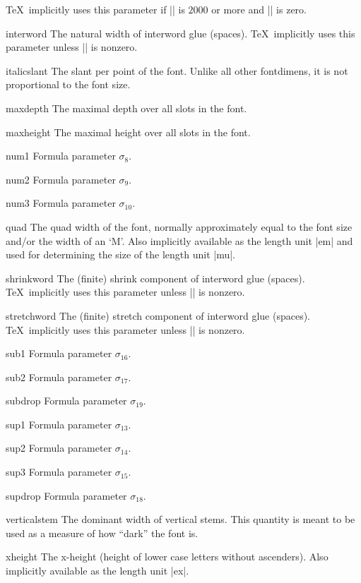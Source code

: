 \documentclass[a4paper]{article}
\begin{document}
\begin{list}{}
  \TeX\ implicitly uses this parameter if |\spacefactor| is $2000$ or 
  more and |\xspaceskip| is zero.
\item[interword]
  The natural width of interword glue (spaces). \TeX\ implicitly uses 
  this parameter unless |\spaceskip| is nonzero.
\item[italicslant]
  The slant per point of the font. Unlike all other fontdimens, it is 
  not proportional to the font size. 
\item[maxdepth]
  The maximal depth over all slots in the font.
\item[maxheight]
  The maximal height over all slots in the font.
\item[num1] Formula parameter $\sigma_{8}$.
\item[num2] Formula parameter $\sigma_{9}$.
\item[num3] Formula parameter $\sigma_{10}$.
\item[quad]
  The quad width of the font, normally approximately equal to the 
  font size and\slash or the width of an `M'. Also implicitly available 
  as the length unit |em| and used for determining the size of the 
  length unit |mu|.
\item[shrinkword]
  The (finite) shrink component of interword glue (spaces). \TeX\ 
  implicitly uses this parameter unless |\spaceskip| is nonzero.
\item[stretchword]
  The (finite) stretch component of interword glue (spaces). \TeX\ 
  implicitly uses this parameter unless |\spaceskip| is nonzero.
\item[sub1] Formula parameter $\sigma_{16}$.
\item[sub2] Formula parameter $\sigma_{17}$.
\item[subdrop] Formula parameter $\sigma_{19}$.
\item[sup1] Formula parameter $\sigma_{13}$.
\item[sup2] Formula parameter $\sigma_{14}$.
\item[sup3] Formula parameter $\sigma_{15}$.
\item[supdrop] Formula parameter $\sigma_{18}$.
\item[verticalstem]
  The dominant width of vertical stems. This quantity is meant to be used 
  as a measure of how ``dark'' the font is.
\item[xheight]
  The x-height (height of lower case letters without ascenders). Also 
  implicitly available as the length unit |ex|.
\end{list}
\end{document}

